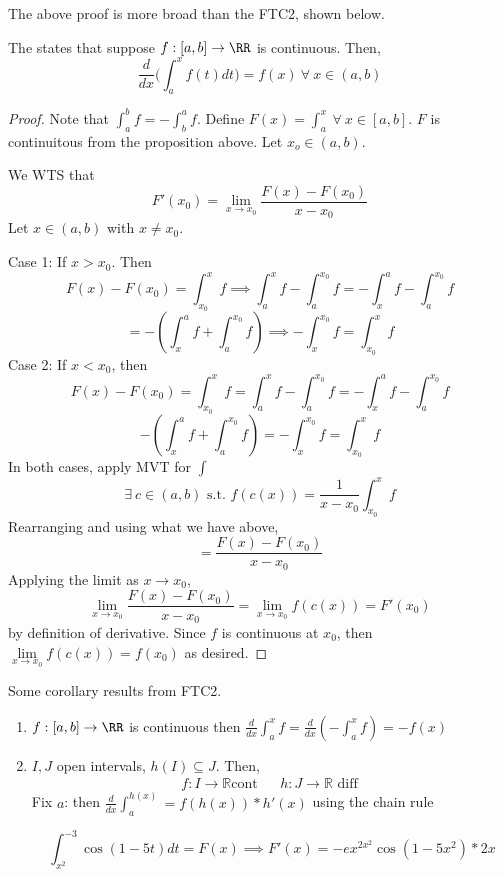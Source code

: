 \documentclass[12pt]{scrartcl}
\begin{document}
\begin{remark}
  The above proof is more broad than the FTC2, shown below.
\end{remark}

\begin{theorem}
  The  states that 
  suppose $f: [a,b] \to \RR$ is continuous. Then, 
  \[\frac{d}{dx} \Biggl(\int_a^x f(t) dt\Biggr) = f(x) \ \forall \ x \in (a,b)\]


  \begin{proof}

    \hfill

    Note that $\int_a^b f = -\int_b^a f$. Define $F(x) = \int_a^x \ \forall \ x \in [a,b]$. 
    $F$ is continuitous from the proposition above. Let $x_o \in (a,b)$. 

    We WTS that
    \[F'(x_0) = \lim_{x\to x_0}\frac{F(x) - F(x_0)}{x - x_0}\]
    Let $x \in (a,b)$ with $x \neq x_0$.

    Case 1: If $x > x_0$. Then 
    \[F(x) - F(x_0) = \int_{x_0}^x f \implies \int_a^x f - \int_a^{x_0} f = -\int_x^a f - \int_a^{x_0} f\]
    \[= -(\int_x^a f + \int_a^{x_0} f) \implies -\int_x^{x_0} f = \int_{x_0}^x f\]
    Case 2: If $x < x_0$, then 
    \[F(x) - F(x_0) = \int_{x_0}^x f = \int_a^x f - \int_a^{x_0} f = -\int_x^a f - \int_a^{x_0} f\]
    \[- (\int_x^a f + \int_a^{x_0} f) = -\int_x^{x_0}f = \int_{x_0}^x f\]
    In both cases, apply MVT for $\int$
    \[\exists \ c \in (a,b) \text{ s.t. } f(c(x)) = \frac{1}{x-x_0}\int_{x_0}^x f\]
    Rearranging and using what we have above,
    \[= \frac{F(x) - F(x_0)}{x - x_0}\]
    Applying the limit as $x\to x_0$,
    \[\lim_{x\to x_0}\frac{F(x) - F(x_0)}{x - x_0} = \lim_{x\to x_0} f(c(x)) = F'(x_0)\]
    by definition of derivative. Since $f$ is continuous at $x_0$, then $\underset{x\to x_0}{\lim} {f(c(x))} = f(x_0)$
    as desired.
  \end{proof}
\end{theorem}

\begin{corollary}
  Some corollary results from FTC2. 

  \begin{enumerate}
    \item $f: [a,b] \to\RR$ is continuous then $\frac{d}{dx} \int_a^x f= \frac{d}{dx}(-\int_a^x f) = -f(x)$
    \item $I, J$ open intervals, $h(I) \subseteq J$. Then,
    \begin{align*}
      f: I \to \mathbb{R} \text{cont} && h: J \to \mathbb{R} \text{ diff }
    \end{align*}
    Fix $a$: then $\frac{d}{dx}\int_a^{h(x)} = f(h(x)) * h'(x)$ using the chain rule

    \[\int_{x^2}^{-3} \cos(1-5t)dt = F(x) \implies F'(x) = -ex^{2x^2}\cos(1-5x^2) * 2x\]
  \end{enumerate}
\end{corollary}
\end{document}
